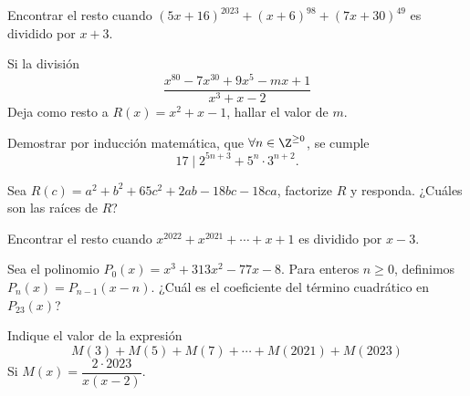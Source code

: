 \begin{section-problem}
    Encontrar el resto cuando $(5x + 16)^{2023} + (x + 6)^{98} + (7x + 30)^{49}$ es dividido por $x + 3$.
\end{section-problem}

\begin{section-problem}
    Si la división
    \[\frac{x^{80} - 7 x^{30} + 9x^5 - mx + 1}{x^3 + x - 2}\]
    Deja como resto a $R(x) = x^2 + x - 1$, hallar el valor de $m$.
\end{section-problem}

\begin{section-problem}
    Demostrar por inducción matemática, que $\forall n \in \Z^{\geq 0}$, se cumple
    \[17 \mid 2^{5n + 3} + 5^n \cdot 3^{n + 2}.\]
\end{section-problem}

\begin{section-problem}
    Sea $R(c) = a^2 + b^2 + 65c^2 + 2ab - 18bc - 18ca$, factorize $R$ y responda.
    ¿Cuáles son las raíces de $R$?
\end{section-problem}

\begin{section-problem}
    Encontrar el resto cuando $x^{2022} + x^{2021} + \cdots + x + 1$ es dividido por $x - 3$.
\end{section-problem}

\begin{section-problem}
    Sea el polinomio $P_0(x) = x^3 + 313x^2 - 77x - 8$.
    Para enteros $n \geq 0$, definimos $P_n(x) = P_{n - 1}(x - n)$.
    ¿Cuál es el coeficiente del término cuadrático en $P_{23}(x)$?
\end{section-problem}

\begin{section-problem}
    Indique el valor de la expresión
    \[M(3)  + M(5) + M(7) + \cdots + M(2021) + M(2023)\]
    Si $M(x) = \dfrac{2\cdot 2023}{x(x - 2)}$.
\end{section-problem}

